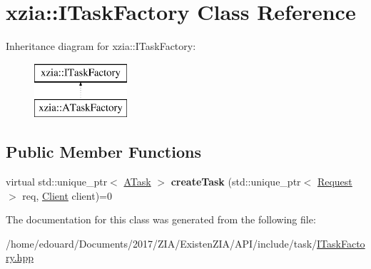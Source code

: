 \hypertarget{classxzia_1_1ITaskFactory}{}\section{xzia\+:\+:I\+Task\+Factory Class Reference}
\label{classxzia_1_1ITaskFactory}
Inheritance diagram for xzia\+:\+:I\+Task\+Factory\+:\begin{figure}[H]
\begin{center}
\leavevmode
\includegraphics[height=2.000000cm]{classxzia_1_1ITaskFactory}
\end{center}
\end{figure}
\subsection*{Public Member Functions}
\begin{DoxyCompactItemize}
\item 
\mbox{\label{classxzia_1_1ITaskFactory_a2fdce8ea701c55eb73d00efd8f367c2c}} 
virtual std\+::unique\+\_\+ptr$<$ \mbox{\hyperlink{classxzia_1_1ATask}{A\+Task}} $>$ {\bfseries create\+Task} (std\+::unique\+\_\+ptr$<$ \mbox{\hyperlink{structxzia_1_1Request}{Request}} $>$ req, \mbox{\hyperlink{structClient}{Client}} client)=0
\end{DoxyCompactItemize}


The documentation for this class was generated from the following file\+:\begin{DoxyCompactItemize}
\item 
/home/edouard/\+Documents/2017/\+Z\+I\+A/\+Existen\+Z\+I\+A/\+A\+P\+I/include/task/\mbox{\hyperlink{ITaskFactory_8hpp}{I\+Task\+Factory.\+hpp}}\end{DoxyCompactItemize}
